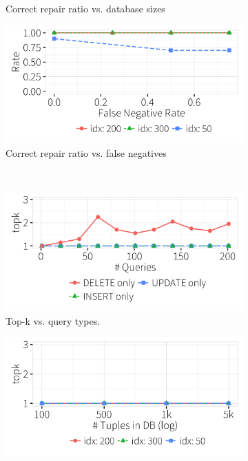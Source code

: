 \begin{figure}[t]
\begin{subfigure} [t]{.3\textwidth}
    \vspace*{-.25in}
    \caption{Correct repair ratio vs. database sizes}
    \label{f:dbsizeratio} 
    \end{subfigure}
    \begin{subfigure} [t]{.3\textwidth}
    \includegraphics[width = .99\columnwidth]{figures/noise_fn_acc_idx}
    \vspace*{-.25in}
    \caption{Correct repair ratio vs. false negatives}
    \label{f:fnratio} 
    \end{subfigure} \\
    \begin{subfigure} [t]{.3\textwidth}
    \includegraphics[width = .99\columnwidth]{figures/indelup_fixcount}
    \vspace*{-.25in}
    \caption{Top-k vs. query types. }
    \vspace*{-.1in}
    \label{f:querytypefixcount} 
    \end{subfigure}
    \begin{subfigure} [t]{.3\textwidth}
    \includegraphics[width = .99\columnwidth]{figures/dbsize_fixcount}

\end{subfigure}
\end{figure}
